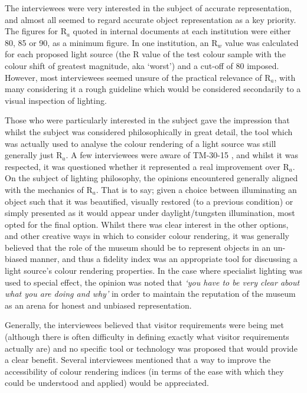 The interviewees were very interested in the subject of accurate representation, and almost all seemed to regard accurate object representation as a key priority. The figures for R$_a$ quoted in internal documents at each institution were either 80, 85 or 90, as a minimum figure. In one institution, an R$_w$ value was calculated for each proposed light source (the R value of the test colour sample with the colour shift of greatest magnitude, aka `worst') and a cut-off of 80 imposed. However, most interviewees seemed unsure of the practical relevance of R$_a$, with many considering it a rough guideline which would be considered secondarily to a visual inspection of lighting.

Those who were particularly interested in the subject gave the impression that whilst the subject was considered philosophically in great detail, the tool which was actually used to analyse the colour rendering of a light source was still generally just R$_a$. A few interviewees were aware of TM-30-15 \citep{color_metric_task_group_of_the_ies_ies_2015}, and whilst it was respected, it was questioned whether it represented a real improvement over R$_a$.
On the subject of lighting philosophy, the opinions encountered generally aligned with the mechanics of R$_a$. That is to say; given a choice between illuminating an object such that it was beautified, visually restored (to a previous condition) or simply presented as it would appear under daylight/tungsten illumination, most opted for the final option. Whilst there was clear interest in the other options, and other creative ways in which to consider colour rendering, it was generally believed that the role of the museum should be to represent objects in an un-biased manner, and thus a fidelity index was an appropriate tool for discussing a light source's colour rendering properties. In the case where specialist lighting was used to special effect, the opinion was noted that \textit{`you have to be very clear about what you are doing and why'} in order to maintain the reputation of the museum as an arena for honest and unbiased representation.

Generally, the interviewees believed that visitor requirements were being met (although there is often difficulty in defining exactly what visitor requirements actually are) and no specific tool or technology was proposed that would provide a clear benefit. Several interviewees mentioned that a way to improve the accessibility of colour rendering indices (in terms of the ease with which they could be understood and applied) would be appreciated.

